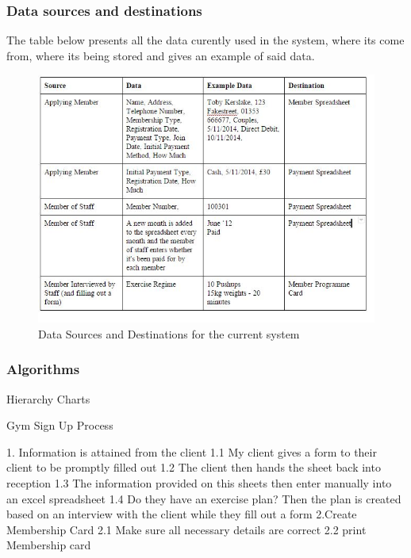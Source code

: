 \subsubsection{Data sources and destinations}

The table below presents all the data curently used in the system, where its come from, where its being stored and gives an example of said data.

\begin{figure}[H]
    \includegraphics[width=\textwidth]{InvestigationTable1.JPG}
    \caption{Data Sources and Destinations for the current system} \label{fig:Current Destinations}
\end{figure}

\subsubsection{Algorithms}

Hierarchy Charts

Gym Sign Up Process
\begin{python}
1. Information is attained from the client
	1.1 My client gives a form to their client to be promptly filled out
	1.2 The client then hands the sheet back into reception 
	1.3 The information provided on this sheets then enter manually into an excel spreadsheet
	1.4 Do they have an exercise plan? Then the plan is created based on an interview  with the client while they fill out a form
2.Create Membership Card
	2.1 Make sure all necessary details are correct
	2.2 print Membership card 
\end{python}

